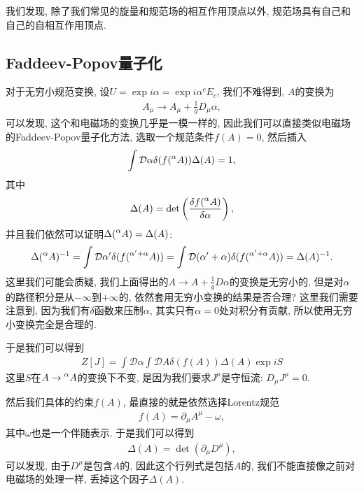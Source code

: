 我们发现, 除了我们常见的旋量和规范场的相互作用顶点以外, 规范场具有自己和自己的自相互作用顶点. 

\subsection{Faddeev-Popov量子化}
对于无穷小规范变换, 设$U=\exp{i\alpha}=\exp{i\alpha^cE_c}$, 我们不难得到, $A$的变换为
\begin{align}
    A_\mu\to A_\mu+\frac1gD_\mu\alpha,
\end{align}
可以发现, 这个和电磁场的变换几乎是一模一样的, 因此我们可以直接类似电磁场的Faddeev-Popov量子化方法, 选取一个规范条件$f(A)=0$, 然后插入
\begin{align}
    \int\mathcal D\alpha\delta(f(\prescript{\alpha}{}{A}))\Delta(A)=1, 
\end{align}
其中
\begin{align}
    \Delta(A)=\det\left(\frac{\delta f(\prescript{\alpha}{}{A})}{\delta\alpha}\right),
\end{align}
并且我们依然可以证明$\Delta(\prescript{\alpha}{}{A})=\Delta(A)$:
\begin{align}
    \Delta(\prescript{\alpha}{}{A})^{-1}=\int\mathcal D\alpha'\delta(f(\prescript{\alpha'+\alpha}{}{A}))=\int\mathcal D(\alpha'+\alpha)\delta(f(\prescript{\alpha'+\alpha}{}{A}))=\Delta(A)^{-1}.
\end{align}
这里我们可能会质疑, 我们上面得出的$A\to A+\frac1gD\alpha$的变换是无穷小的, 但是对$\alpha$的路径积分是从$-\infty$到$+\infty$的, 依然套用无穷小变换的结果是否合理? 这里我们需要注意到, 因为我们有$\delta$函数来压制$\alpha$, 其实只有$\alpha=0$处对积分有贡献, 所以使用无穷小变换完全是合理的.

于是我们可以得到
\begin{align}
    Z[J]=\int\mathcal D\alpha\int\mathcal DA\delta(f(A))\Delta(A)\exp{iS}
\end{align}
这里$S$在$A\to\prescript{\alpha}{}{A}$的变换下不变, 是因为我们要求$J^\mu$是守恒流: $D_\mu J^\mu=0$.

然后我们具体的约束$f(A)$, 最直接的就是依然选择Lorentz规范
\begin{align}
    f(A)=\partial_\mu A^\mu-\omega, 
\end{align}
其中$\omega$也是一个伴随表示. 于是我们可以得到
\begin{align}
    \Delta(A)=\det\left(\partial_\mu D^\mu\right),
\end{align}
可以发现, 由于$D^\mu$是包含$A$的, 因此这个行列式是包括$A$的, 我们不能直接像之前对电磁场的处理一样, 丢掉这个因子$\Delta(A)$.

